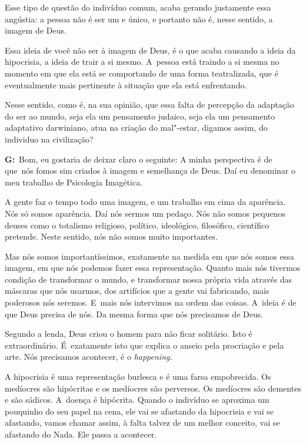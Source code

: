  

Esse tipo de questão do indivíduo comum, acaba gerando justamente essa
angústia: a pessoa não é ser um e único, e portanto não é, nesse
sentido, a imagem de Deus.

 

Essa ideia de você não ser à imagem de Deus, é o que acaba causando a
ideia da hipocrisia, a ideia de trair a si mesmo. A~pessoa está traindo
a si mesma no momento em que ela está se comportando de uma forma
teatralizada, que é eventualmente mais pertinente à situação que ela
está enfrentando.

 

Nesse sentido, como é, na sua opinião, que essa falta de percepção da
adaptação do ser ao mundo, seja ela um pensamento judaico, seja ela um
pensamento adaptativo darwiniano, atua na criação do mal"-estar, digamos
assim, do individuo na civilização?

 

\textbf{G:}~Bom, eu gostaria de deixar claro o seguinte: A minha
perspectiva é de que\textbf{}~nós fomos sim criados à imagem e
semelhança de Deus. Daí eu denominar o meu trabalho de Psicologia
Imagética.

 

A gente faz o tempo todo uma imagem, e um trabalho em cima da aparência.
Nós só somos aparência. Daí nós sermos um pedaço. Nós não somos pequenos
deuses como o totalismo religioso, político, ideológico, filosófico,
científico pretende. Neste sentido, nós não somos muito importantes.

 

Mas nós somos importantíssimos, exatamente na medida em que nós somos
essa imagem, em que nós podemos fazer essa representação. Quanto mais
nós tivermos condição de transformar o mundo, e transformar nossa
própria vida através das máscaras que nós usarmos, dos artifícios que a
gente vai fabricando, mais poderosos nós seremos. E~mais nós intervimos
na ordem das coisas. A~ideia é de que Deus precisa de nós. Da mesma
forma que nós precisamos de Deus.

 

Segundo a lenda, Deus criou o homem para não ficar solitário. Isto é
extraordinário. É~exatamente isto que explica o anseio pela procriação e
pela arte. Nós precisamos acontecer, é o \emph{happening.}

 

A hipocrisia é uma representação burlesca e é uma farsa empobrecida. Os
medíocres são hipócritas e os medíocres são perversos. Os medíocres são
dementes e são sádicos. A~doença é hipócrita. Quando o indivíduo se
aproxima um pouquinho do seu papel na cena, ele vai se afastando da
hipocrisia e vai se afastando, vamos chamar assim, à falta talvez de um
melhor conceito, vai se afastando do Nada. Ele passa a acontecer.

